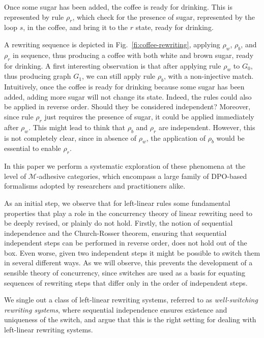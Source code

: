 \documentclass[a4paper,UKenglish,cleveref,pdftex,thm-restate,numberwithinsect]{lipics-v2021}
\begin{document}
Once some sugar has been added, the coffee is ready for drinking. This is represented by rule $\rho_r$, which check for the presence of sugar, represented by the loop $s$, in the coffee, and bring it to the $r$ state, ready for drinking.

A rewriting sequence is depicted in Fig.~\ref{fi:coffee-rewriting}, applying $\rho_w$, $\rho_b$, and $\rho_r$ in sequence, thus producing a coffee with both white and brown sugar, ready for drinking. A first interesting observation is that after applying rule $\rho_w$ to $G_0$, thus producing graph $G_1$, we can still apply rule $\rho_b$, with a non-injective match. Intuitively, once the coffee is ready for drinking because some sugar has been added, adding more sugar will not change its state. Indeed, the rules could also be applied in reverse order. Should they be considered independent? Moreover, since rule $\rho_r$ just requires the presence of sugar, it could be applied immediately after $\rho_w$. This might lead to think that $\rho_b$ and $\rho_r$ are independent. However, this is not completely clear, since in absence of $\rho_w$, the application of $\rho_b$ would be essential to enable $\rho_r$.

In this paper we perform a systematic exploration of these phenomena at the
level of $\mathcal{M}$-adhesive categories,
which encompass a large family of DPO-based formalisms adopted by researchers and 
practitioners alike. 

As an initial step, %
we observe that for
left-linear rules some fundamental properties that play a role
in the concurrency theory of linear rewriting need to be deeply revised, or
plainly do not hold.
%
Firstly, the notion of sequential independence and the Church-Rosser
theorem, ensuring that sequential independent steps can be performed
in reverse order, does not hold out of the box. Even worse, given two
independent steps it might be possible to switch them in several
different ways.
%
As we will observe, this prevents the development of a sensible theory
of concurrency, since switches are used as a basis for equating
sequences of rewriting steps that differ only in the order of
independent steps.

We single out a class of left-linear rewriting
systems, referred to as \emph{well-switching rewriting systems}, 
where sequential independence ensures existence and uniqueness of the
switch, and argue that this is the right setting for dealing with
left-linear rewriting systems.
\end{document}
